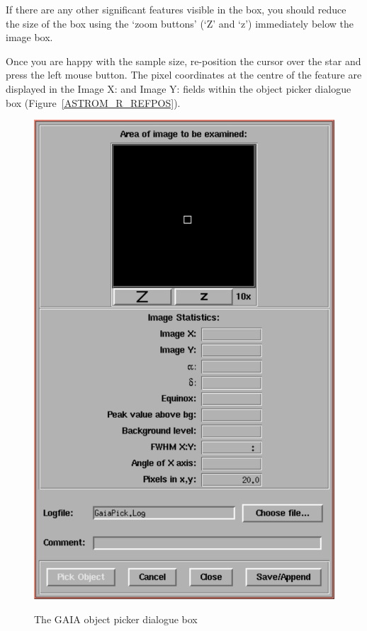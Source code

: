 \documentclass[twoside,11pt]{starlink}
\begin{document}
\begin{enumerate}
   If there are any other significant features visible in the box, you
   should reduce the size of the box using the `zoom buttons' (`\textsf{Z}'
   and `\textsf{z}') immediately below the image box.

   Once you are happy with the sample size, re-position the cursor over the
   star and press the left mouse button.  The pixel coordinates at the
   centre of the feature are displayed in the \textsf{Image X:} and \textsf{Image Y:} fields within the object picker dialogue box
   (Figure~\ref{ASTROM_R_REFPOS}).

  \begin{figure}[htbp]
     \centering
     \includegraphics[totalheight=4in]{sc17_astrom_r_pickbox}
     \begin{quote}
     \caption{The GAIA object picker dialogue box
     \label{ASTROM_R_PICKBOX} }
     \end{quote}
  \end{figure}


\end{enumerate}
\end{document}
